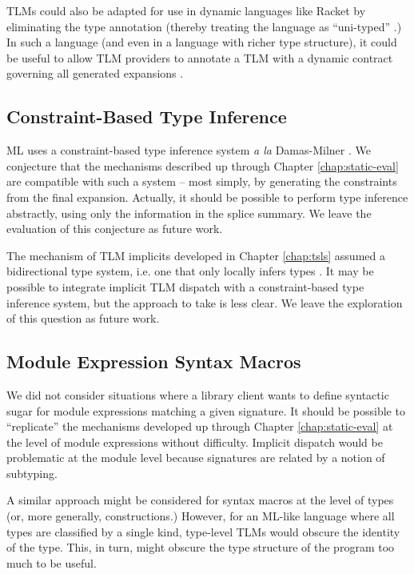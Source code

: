 TLMs could also be adapted for use in dynamic languages like Racket  by eliminating the type annotation (thereby treating the language as ``uni-typed'' \cite{scott1980lambda,pfpl}.) In such a language (and  even in a language with richer type structure), it could be useful to allow TLM providers to annotate a TLM with a dynamic contract governing all generated expansions \cite{DBLP:conf/icfp/FindlerF02}. 

\vspace{-4px}
\subsection{Constraint-Based Type Inference}\label{sec:type-inference}
ML uses a constraint-based type inference system \emph{a la} Damas-Milner \cite{damas1982principal}. We conjecture that the mechanisms described up through Chapter \ref{chap:static-eval} are compatible with such a system -- most simply, by generating the constraints from the final expansion. Actually, it should be possible to perform type inference abstractly, using only the information in the splice summary. We leave the evaluation of this conjecture as future work.

The mechanism of TLM implicits developed in Chapter \ref{chap:tsls} assumed a bidirectional type system, i.e. one that only locally infers types \cite{Pierce:2000:LTI:345099.345100}. It may be possible to integrate implicit TLM dispatch with a constraint-based type inference system, but the approach to take is less clear. We leave the exploration of this question as future work.

\vspace{-4px}
\subsection{Module Expression Syntax Macros}
We did not consider situations where a library client wants to define syntactic sugar for  module expressions matching a given signature. It should be possible to ``replicate'' the mechanisms developed up through Chapter \ref{chap:static-eval} at the level of module expressions without difficulty. Implicit dispatch would be problematic at the module level because signatures are related by a notion of subtyping.

A similar approach might be considered for syntax macros at the level of types (or, more generally, constructions.) However, for an ML-like language where all types are classified by a single kind, type-level TLMs would obscure the identity of the type. This, in turn, might obscure the type structure of the program too much to be useful.

